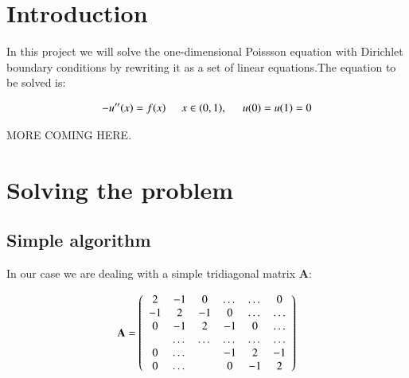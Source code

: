 \documentclass{aa}
\begin{document}
  




\section{Introduction}\label{sec:introduction}
In this project we will solve the one-dimensional Poissson equation with Dirichlet boundary conditions by rewriting it as a set of linear equations.The equation to be solved is:

\begin{equation}
    \begin{aligned}
	-u''(x) = f(x) \hspace{0.5cm} x\in(0,1), \hspace{0.5cm} u(0) = u(1) = 0
    \end{aligned}
\end{equation}

MORE COMING HERE.


\section{Solving the problem}\label{sec:observations}
\subsection{Simple algorithm}
In our case we are dealing with a simple tridiagonal matrix \textbf{A}:

\begin{equation}
    {\bf A} = \left(\begin{array}{cccccc}
                           2& -1& 0 &\dots   & \dots &0 \\
                           -1 & 2 & -1 &0 &\dots &\dots \\
                           0&-1 &2 & -1 & 0 & \dots \\
                           & \dots   & \dots &\dots   &\dots & \dots \\
                           0&\dots   &  &-1 &2& -1 \\
                           0&\dots    &  & 0  &-1 & 2 \\
                      \end{array} \right)
\end{equation}
\end{document}
